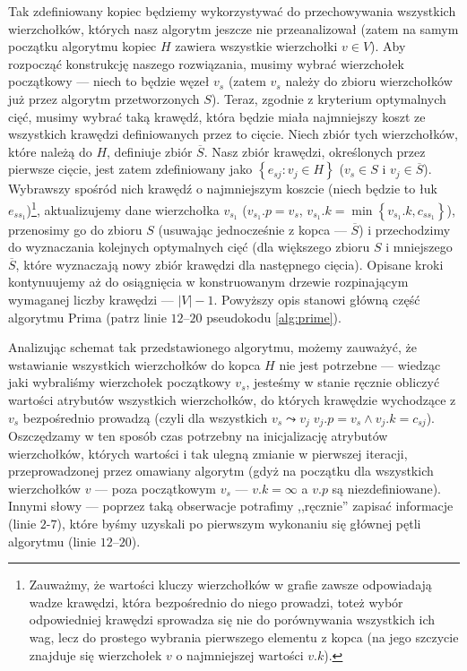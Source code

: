 Tak zdefiniowany kopiec będziemy wykorzystywać do przechowywania wszystkich wierzchołków, których nasz algorytm jeszcze nie przeanalizował (zatem na samym początku algorytmu kopiec $H$ zawiera wszystkie wierzchołki $v \in V$). Aby rozpocząć konstrukcję naszego rozwiązania, musimy wybrać wierzchołek początkowy --- niech to będzie węzeł $v_{s}$ (zatem $v_{s}$ należy do zbioru wierzchołków już przez algorytm przetworzonych $S$). Teraz, zgodnie z kryterium optymalnych cięć, musimy wybrać taką krawędź, która będzie miała najmniejszy koszt ze wszystkich krawędzi definiowanych przez to cięcie. Niech zbiór tych wierzchołków, które należą do $H$, definiuje zbiór $\overline{S}$. Nasz zbiór krawędzi, określonych przez pierwsze cięcie, jest zatem zdefiniowany jako $\left\{ e_{sj} : v_{j} \in H \right\}$ ($v_{s} \in S$ i $v_{j} \in \overline{S}$). Wybrawszy spośród nich krawędź o najmniejszym koszcie (niech będzie to łuk $e_{ss_{1}}$)\footnote{Zauważmy, że wartości kluczy wierzchołków w grafie zawsze odpowiadają wadze krawędzi, która bezpośrednio do niego prowadzi, toteż wybór odpowiedniej krawędzi sprowadza się nie do porównywania wszystkich ich wag, lecz do prostego wybrania pierwszego elementu z kopca (na jego szczycie znajduje się wierzchołek $v$ o najmniejszej wartości $v.k$).}, aktualizujemy dane wierzchołka $v_{s_{1}}$ ($v_{s_{1}}.p = v_{s}$, $v_{s_{1}}.k = \min \left\{ v_{s_{1}}.k, c_{ss_{1}} \right\}$), przenosimy go do zbioru $S$ (usuwając jednocześnie z kopca --- $\overline{S}$) i przechodzimy do wyznaczania kolejnych optymalnych cięć (dla większego zbioru $S$ i mniejszego $\overline{S}$, które wyznaczają nowy zbiór krawędzi dla następnego cięcia). Opisane kroki kontynuujemy aż do osiągnięcia w konstruowanym drzewie rozpinającym wymaganej liczby krawędzi --- $\left| V \right| - 1$. Powyższy opis stanowi główną część algorytmu Prima (patrz linie $12$--$20$ pseudokodu \ref{alg:prime}).

Analizując schemat tak przedstawionego algorytmu, możemy zauważyć, że wstawianie wszystkich wierzchołków do kopca $H$ nie jest potrzebne --- wiedząc jaki wybraliśmy wierzchołek początkowy $v_{s}$, jesteśmy w stanie ręcznie obliczyć wartości atrybutów wszystkich wierzchołków, do których krawędzie wychodzące z $v_{s}$ bezpośrednio prowadzą (czyli dla wszystkich $v_{s} \leadsto v_{j} \; v_{j}.p = v_{s} \wedge v_{j}.k = c_{sj}$). Oszczędzamy w ten sposób czas potrzebny na inicjalizację atrybutów wierzchołków, których wartości i tak ulegną zmianie w pierwszej iteracji, przeprowadzonej przez omawiany algorytm (gdyż na początku dla wszystkich wierzchołków $v$ --- poza początkowym $v_{s}$ --- $v.k = \infty$ a $v.p$ są niezdefiniowane). Innymi słowy --- poprzez taką obserwacje potrafimy ,,ręcznie'' zapisać informacje (linie $2$-$7$), które byśmy uzyskali po pierwszym wykonaniu się głównej pętli algorytmu (linie $12$--$20$).

